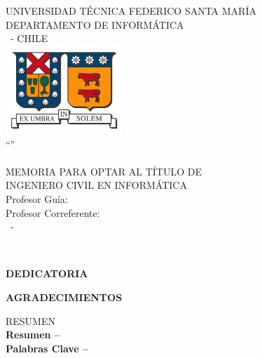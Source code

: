 \begin{titlepage}
\begin{center}
\noindent
{\fontsize{18}{22}\selectfont UNIVERSIDAD TÉCNICA FEDERICO SANTA MARÍA \\}
{\fontsize{16}{19}\selectfont DEPARTAMENTO DE INFORMÁTICA \\}
{\fontsize{16}{19}\selectfont \MakeUppercase{\ciudad}\ - CHILE \\}
\vspace{1.5cm}
\includegraphics[width=4.41cm,height=3.34cm]{logo/logo.jpg} \\
\vspace{1.5cm}
{\fontsize{20}{24}\selectfont ``\MakeUppercase{\titulo}'' \\}
\vfill
{\fontsize{16}{19}\selectfont \MakeUppercase{\nombrealumno} \\}
\vfill
{\fontsize{16}{19}\selectfont MEMORIA PARA OPTAR AL TÍTULO DE \\}
{\fontsize{16}{19}\selectfont INGENIERO CIVIL EN INFORMÁTICA \\}
\vspace{1.5cm}
{\fontsize{14}{17}\selectfont Profesor Guía: \nombreprofesor \\}
{\fontsize{14}{17}\selectfont Profesor Correferente: \nombrecorreferente \\}
\vspace{2.5cm}
{\fontsize{14}{17}\selectfont \mesexamen\ - \anioexamen \\}
\end{center}
\end{titlepage}

\
\vfill
\vfill
\begin{flushright}
{\fontsize{16}{19}\selectfont \textbf{DEDICATORIA} \\}
\end{flushright}
\begin{flushright}
\dedicatoria
\end{flushright}
\vfill
\newpage
\begin{center}
{\fontsize{16}{19}\selectfont \textbf{AGRADECIMIENTOS} \\}
\end{center}
\agradecimientos
\vfill

\newpage
{\fontsize{16}{19}\selectfont RESUMEN \\}
\vspace{0.25cm}
\textbf{Resumen -- } \resumen
\\
\textbf{Palabras Clave -- } \palabrasclave

\newpage
